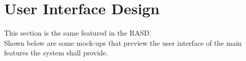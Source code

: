 \documentclass[a4paper,11pt]{report} %
\begin{document}
	\begin{minipage}{\linewidth}
	\end{minipage}	
	
	\section{User Interface Design}
	This section is the same featured in the RASD.\\
	Shown below are some mock-ups that preview the user interface of the main features the system shall provide.
	
\end{document}
